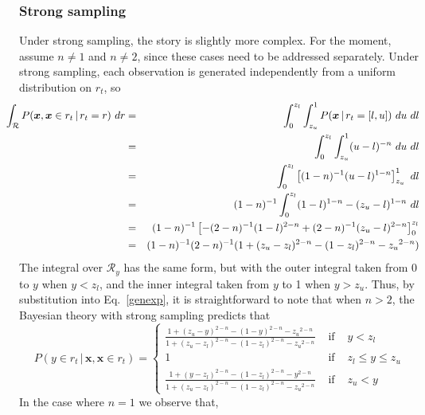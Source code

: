\documentclass[doc]{apa6}
\newcommand{\p}{P}
\newcommand{\xn}{{\bm{x}}}
\newcommand{\rt}{{r_t}}
\newcommand{\condon}{\, | \,}
\begin{document}
\subsubsection{Strong sampling} Under strong sampling, the story is slightly more complex. For the moment, assume $n\neq 1$ and $n\neq 2$, since these cases need to be addressed separately. Under strong sampling, each observation is generated independently from a uniform distribution on $\rt$, so
\begin{eqnarray}
\mbox{\hspace*{-15pt}} \int_{\mathcal{R}} \p(\xn, \xn \in \rt \condon  \rt=r) \ dr &=& \int_0^{z_l} \int_{z_u}^1 \p(\xn \condon  \rt = [l,u]) \ du \ dl \nonumber \\
&=& \int_0^{z_l} \int_{z_u}^1 (u-l)^{-n} \ du \ dl \nonumber \\
&=& \int_0^{z_l} \left[ (1-n)^{-1} (u-l)^{1-n} \right]_{z_u}^1 \ dl \nonumber \\
&=& (1-n)^{-1} \int_0^{z_l} (1-l)^{1-n} - (z_u -l)^{1-n} \ dl \nonumber \\
&=& (1-n)^{-1} \left[ -(2-n)^{-1}(1-l)^{2-n} + (2-n)^{-1}(z_u - l)^{2-n} \right]^{z_l}_0 \nonumber \\
&=& (1-n)^{-1} (2-n)^{-1} (1 + (z_u - z_l)^{2-n} - (1-z_l)^{2-n} - {z_u}^{2-n}) \nonumber \\
\end{eqnarray}
The integral over $\mathcal{R}_y$ has the same form, but with the outer integral taken from 0 to $y$ when $y<z_l$, and the inner integral taken from $y$ to 1 when $y>z_u$. Thus, by substitution into Eq.~\ref{genexp}, it is straightforward to note that when $n>2$, the Bayesian theory with strong sampling predicts that
\begin{equation}
\p(y \in \rt \condon  \xn,  \xn \in \rt) = \left\{ \begin{array}{rcl} \displaystyle\frac{1 + (z_u - y)^{2-n} - (1-y)^{2-n} - {z_u}^{2-n}}{1 + (z_u - z_l)^{2-n} - (1-z_l)^{2-n} - {z_u}^{2-n}} & \mbox{ if } & y<z_l \\ 1 & \mbox{ if } & z_l \leq y \leq z_u \\  \displaystyle\frac{1 + (y - z_l)^{2-n} - (1-z_l)^{2-n} - {y}^{2-n}}{1 + (z_u - z_l)^{2-n} - (1-z_l)^{2-n} - {z_u}^{2-n}} & \mbox{ if } & z_u < y  \end{array} \right.
\end{equation}
In the case where $n=1$ we observe that,
\end{document}
